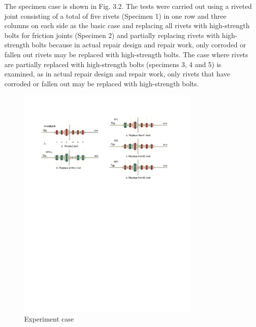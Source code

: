 The specimen case is shown in Fig. 3.2. The tests were carried out using a riveted joint consisting of a total of five rivets (Specimen 1) in one row and three columns on each side as the basic case and replacing all rivets with high-strength bolts for friction joints (Specimen 2) and partially replacing rivets with high-strength bolts because in actual repair design and repair work, only corroded or fallen out rivets may be replaced with high-strength bolts. The case where rivets are partially replaced with high-strength bolts (specimens 3, 4 and 5) is examined, as in actual repair design and repair work, only rivets that have corroded or fallen out may be replaced with high-strength bolts.

\begin{figure}
    \centering
    \includegraphics[width=0.8\textwidth]{imgs/ch3/riveexpcase.pdf}
    \caption{Experiment case}
    \label{fig:enter-label}
\end{figure}

